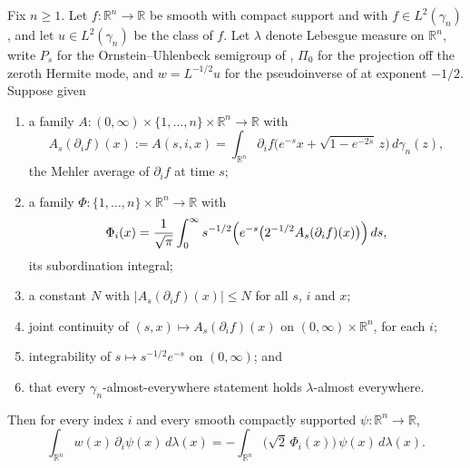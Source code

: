 \begin{lemma}
Fix $n \geq 1$.  Let $f : \mathbb{R}^n \to \mathbb{R}$ be smooth with compact
support and with $f \in L^2(\gamma_n)$, and let $u \in L^2(\gamma_n)$ be the
class of $f$.  Let $\lambda$ denote Lebesgue measure on $\mathbb{R}^n$, write
$P_s$ for the Ornstein--Uhlenbeck semigroup of , $\Pi_0$ for
the projection off the zeroth Hermite mode, and $w = L^{-1/2}u$ for the
pseudoinverse of  at exponent $-1/2$.  Suppose given
\begin{enumerate}
  \item[(a)] a family $A : (0,\infty) \times \{1,\ldots,n\} \times \mathbb{R}^n
    \to \mathbb{R}$ with
    \[
      A_s(\partial_i f)(x)
        := A(s,i,x)
        = \int_{\mathbb{R}^n} \partial_i f\bigl(e^{-s}x
            + \sqrt{1-e^{-2s}}\,z\bigr)\,d\gamma_n(z) ,
    \]
    the Mehler average of $\partial_i f$ at time $s$;
  \item[(b)] a family $\Phi : \{1,\ldots,n\} \times \mathbb{R}^n \to \mathbb{R}$
    with
    \[
      \Phi_i(x) = \frac{1}{\sqrt\pi}\int_0^\infty s^{-1/2}
        \Bigl(e^{-s}\bigl(2^{-1/2}A_s(\partial_i f)(x)\bigr)\Bigr)\,ds ,
    \]
    its subordination integral;
  \item[(c)] a constant $N$ with $|A_s(\partial_i f)(x)| \leq N$ for all $s$, $i$
    and $x$;
  \item[(d)] joint continuity of $(s,x) \mapsto A_s(\partial_i f)(x)$ on
    $(0,\infty)\times\mathbb{R}^n$, for each $i$;
  \item[(e)] integrability of $s \mapsto s^{-1/2}e^{-s}$ on $(0,\infty)$; and
  \item[(f)] that every $\gamma_n$-almost-everywhere statement holds
    $\lambda$-almost everywhere.
\end{enumerate}
Then for every index $i$ and every smooth compactly supported
$\psi : \mathbb{R}^n \to \mathbb{R}$,
\[
  \int_{\mathbb{R}^n} w(x)\,\partial_i\psi(x)\,d\lambda(x)
    = -\int_{\mathbb{R}^n} \bigl(\sqrt2\,\Phi_i(x)\bigr)\,\psi(x)\,d\lambda(x) .
\]
\end{lemma}
